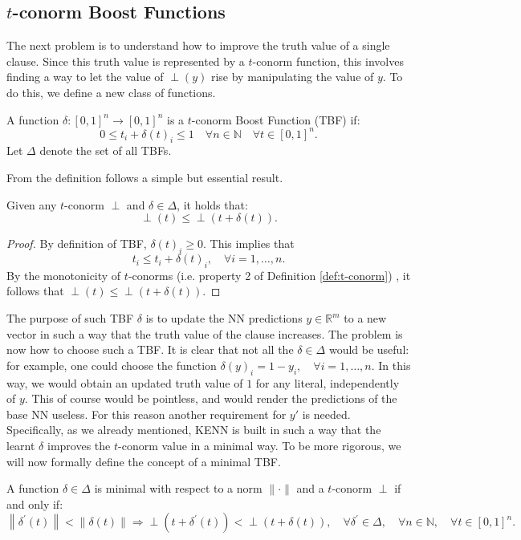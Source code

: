 \subsection{$t$-conorm Boost Functions}
The next problem is to understand how to improve the truth value of a single clause. Since this truth value is represented by a $t$-conorm function, this involves finding a way to let the value of $\perp(y)$ rise by manipulating the value of $y$. To do this, we define a new class of functions.

\begin{definition}
	A function $\delta:[0,1]^{n} \rightarrow[0,1]^{n}$ is a $t$-conorm Boost Function (TBF) if:
	$$
	0 \leq t_{i}+\delta(t)_{i} \leq 1  \quad \forall n \in \mathbb{N} \quad \forall t \in[0,1]^{n}.
	$$
	Let $\Delta$ denote the set of all TBFs.
\end{definition}
From the definition follows a simple but essential result.

\begin{lemma}
	Given any $t$-conorm $\perp$ and $\delta \in \Delta$, it holds that:
	$$ \perp(t) \leq \perp(t + \delta(t)).$$
\end{lemma}
\begin{proof}
	By definition of TBF, $\delta(t)_i \geq 0$. This implies that $$t_i \leq t_i + \delta(t)_i, \quad \forall i=1,\dots,n.$$By the monotonicity of $t$-conorms
	\textcolor{unipd}{(i.e. property 2 of Definition \ref{def:t-conorm})}
	, it follows that $\perp(t) \leq \perp(t+\delta(t))$.
\end{proof}

The purpose of such TBF $\delta$ is to update the NN predictions $y \in \mathbb{R}^m$ to a new vector %
in such a way that the truth value of the clause increases. The problem is now how to choose such a TBF. It is clear that not all the $\delta \in \Delta$ would be useful: for example, one could choose the function $\delta(y)_i = 1-y_i, \quad \forall i=1,\dots,n$. In this way, we would obtain an updated truth value of $1$ for any literal, independently of $y$. This of course would be pointless, and would render the predictions of the base NN useless. For this reason another requirement for $y'$ is needed. Specifically, as we already mentioned, KENN is built in such a way that the learnt $\delta$ improves the $t$-conorm value in a minimal way. To be more rigorous, we will now formally define the concept of a minimal TBF.

\begin{definition}
	A function $\delta \in \Delta$ is minimal with respect to a norm $\|\cdot\|$ and a $t$-conorm $\perp$ if and only if:
	$$
	\left\|\delta^{\prime}(t)\right\|<\|\delta(t)\| \Rightarrow \perp\left(t+\delta^{\prime}(t)\right)<\perp(t+\delta(t)), \quad \forall \delta^{\prime} \in \Delta, \quad \forall n \in \mathbb{N}, \quad \forall t \in[0,1]^{n}.
	$$
\end{definition}

